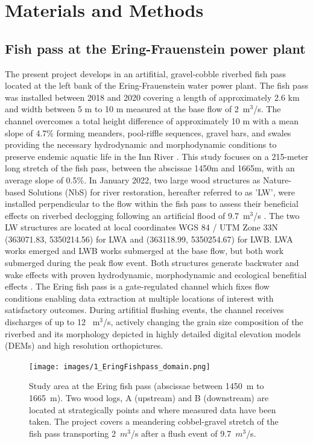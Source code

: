 \documentclass[draft,linenumbers,onecolumn]{agujournal2019} %
\begin{document}
\section{Materials and Methods} 
\label{Materials}

\subsection{Fish pass at the Ering-Frauenstein power plant}
\label{subsec:Sec2.1 }
The present project develops in an artifitial, gravel-cobble riverbed fish pass located at the left bank of the Ering-Frauenstein water power plant. The fish pass was installed between 2018 and 2020 covering a length of approximately 2.6 km  and width between 5 m to 10 m measured at the base flow of  2~m$^3$/s. The channel overcomes a total height difference of approximately 10 m with a mean slope of 4.7\% forming meanders, pool-riffle sequences, gravel bars, and swales providing the necessary hydrodynamic and morphodynamic conditions to preserve endemic aquatic life in the Inn River \cite{schwindt2023fuzzylogic,zauner2020wie}. This study focuses on a 215-meter long stretch of the fish pass, between the abscissae 1450m and 1665m, with an average slope of 0.5\%. In January 2022, two large wood structures as Nature-based Solutions (NbS) for river restoration, hereafter referred to as 'LW', were installed perpendicular to the flow within the fish pass to assess their beneficial effects on riverbed declogging following an artificial flood of 9.7~m$^3$/s  \cite{schwindt2023fuzzylogic}. The two LW structures are located at local coordinates WGS 84 / UTM Zone 33N (363071.83, 5350214.56) for LWA and (363118.99, 5350254.67) for LWB. LWA works emerged and LWB works submerged at the base flow, but both work submerged during the peak flow event. Both structures generate backwater and wake effects with proven  hydrodynamic, morphodynamic and ecological benefitial effects \cite{schalko2021flow,schwindt2023fuzzylogic}.    
The Ering fish pass is a gate-regulated channel which fixes flow conditions enabling data extraction at multiple locations of interest with satisfactory outcomes. During artifitial flushing events, the channel receives discharges of up to 12 ~m$^3$/s, actively changing the grain size composition of the riverbed and its morphology depicted in highly detailed digital elevation models (DEMs) and high resolution orthopictures.


\begin{figure}[htbp]
	\centering
	\texttt{[image: images/1\_EringFishpass\_domain.png]}
	\caption{Study area  at the Ering fish pass (abscissae between 1450~m to 1665~m). Two wood logs, A (upstream) and B (downstream) are located at strategically points and where measured data have been taken. The project covers a meandering cobbel-gravel stretch of the fish pass transporting 2~$m^3$/s after a flush event of 9.7~$m^3$/s.   
	}
	\label{fig:StudyArea}
\end{figure}
\end{document}
